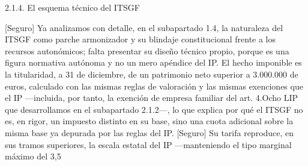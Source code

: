 \documentclass[10pt,a4paper]{article}
\begin{document}
2.1.4. El esquema técnico del ITSGF

[Seguro] Ya analizamos con detalle, en el subapartado 1.4, la naturaleza del ITSGF como parche armonizador y su blindaje constitucional frente a los recursos autonómicos; falta presentar su diseño técnico propio, porque es una figura normativa autónoma y no un mero apéndice del IP. El hecho imponible es la titularidad, a 31 de diciembre, de un patrimonio neto superior a 3.000.000 de euros, calculado con las mismas reglas de valoración y las mismas exenciones que el IP —incluida, por tanto, la exención de empresa familiar del art. 4.Ocho LIP que desarrollamos en el subapartado 2.1.2—, lo que explica por qué el ITSGF no es, en rigor, un impuesto distinto en su base, sino una cuota adicional sobre la misma base ya depurada por las reglas del IP. [Seguro] Su tarifa reproduce, en sus tramos superiores, la escala estatal del IP —manteniendo el tipo marginal máximo del 3,5%
\end{document}
